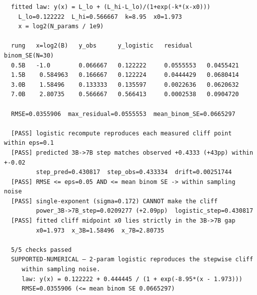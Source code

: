 \documentclass[11pt,a4paper]{article}
\begin{document}
\begin{verbatim}
  fitted law: y(x) = L_lo + (L_hi-L_lo)/(1+exp(-k*(x-x0)))
    L_lo=0.122222  L_hi=0.566667  k=8.95  x0=1.973
    x = log2(N_params / 1e9)

  rung   x=log2(B)   y_obs      y_logistic   residual    binom_SE(N=30)
  0.5B   -1.0        0.066667   0.122222     0.0555553   0.0455421
  1.5B    0.584963   0.166667   0.122224     0.0444429   0.0680414
  3.0B    1.58496    0.133333   0.135597     0.0022636   0.0620632
  7.0B    2.80735    0.566667   0.566413     0.0002538   0.0904720

  RMSE=0.0355906  max_residual=0.0555553  mean_binom_SE=0.0665297

  [PASS] logistic recompute reproduces each measured cliff point within eps=0.1
  [PASS] predicted 3B->7B step matches observed +0.4333 (+43pp) within +-0.02
         step_pred=0.430817  step_obs=0.433334  drift=0.00251744
  [PASS] RMSE <= eps=0.05 AND <= mean binom SE -> within sampling noise
  [PASS] single-exponent (sigma=0.172) CANNOT make the cliff
         power_3B->7B_step=0.0209277 (+2.09pp)  logistic_step=0.430817
  [PASS] fitted cliff midpoint x0 lies strictly in the 3B->7B gap
         x0=1.973  x_3B=1.58496  x_7B=2.80735

  5/5 checks passed
  SUPPORTED-NUMERICAL — 2-param logistic reproduces the stepwise cliff
     within sampling noise.
     law: y(x) = 0.122222 + 0.444445 / (1 + exp(-8.95*(x - 1.973)))
     RMSE=0.0355906 (<= mean binom SE 0.0665297)
\end{verbatim}



\end{document}
